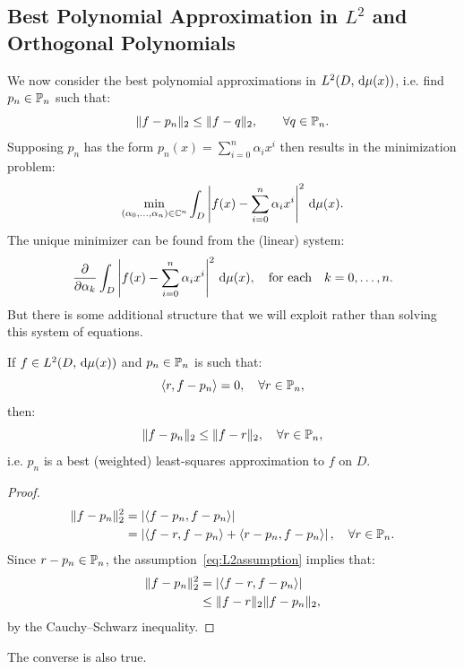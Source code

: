 \subsection{Best Polynomial Approximation in $L^2$ and Orthogonal Polynomials}

We now consider the best polynomial approximations in $L^2(D,\ud\mu(x))$, i.e. find $p_n\in\P_n$ such that:
\[
\|f-p_n\|_2 \le \|f-q\|_2,\qquad\forall q\in\P_n.
\]
Supposing $p_n$ has the form $p_n(x) = \sum_{i=0}^n \alpha_i x^i$ then results in the minimization problem:
\[
\min_{(\alpha_0,\ldots,\alpha_n)\in\C^n} \int_D \abs{f(x)-\sum_{i=0}^n \alpha_i x^i}^2\ud\mu(x).
\]
The unique minimizer can be found from the (linear) system:
\[
\dfrac{\partial}{\partial\alpha_k}\int_D \abs{f(x)-\sum_{i=0}^n \alpha_i x^i}^2\ud\mu(x),\quad\hbox{for each}\quad k=0,\ldots,n.
\]
But there is some additional structure that we will exploit rather than solving this system of equations.

\begin{theorem}
If $f\in L^2(D,\ud\mu(x))$ and $p_n\in\P_n$ is such that:
\begin{equation}\label{eq:L2assumption}
\langle r,f-p_n\rangle = 0,\quad \forall r\in\P_n,
\end{equation}
then:
\begin{equation}
\|f-p_n\|_2 \le \|f-r\|_2,\quad \forall r\in\P_n,
\end{equation}
i.e. $p_n$ is a best (weighted) least-squares approximation to $f$ on $D$.
\end{theorem}
\begin{proof}
\begin{align*}
\|f-p_n\|_2^2 & = \abs{\langle f-p_n,f-p_n\rangle}\\
& = \abs{\langle f-r,f-p_n\rangle + \langle r-p_n,f-p_n\rangle},\quad \forall r\in\P_n.
\end{align*}
Since $r-p_n\in\P_n$, the assumption~\eqref{eq:L2assumption} implies that:
\begin{align*}
\|f-p_n\|_2^2 & = \abs{\langle f-r,f-p_n\rangle}\\
& \le \|f-r\|_2\|f-p_n\|_2,
\end{align*}
by the Cauchy--Schwarz inequality.
\end{proof}
\begin{remark}
The converse is also true.
\end{remark}

